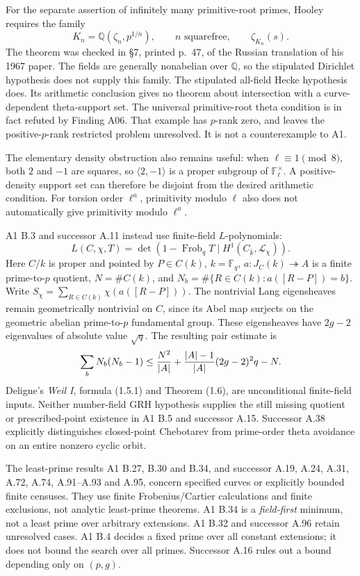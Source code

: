 \documentclass[11pt,a4paper]{article}
\begin{document}
For the separate assertion of infinitely many primitive-root primes,
Hooley requires the family
\[
 K_n=\mathbb Q(\zeta_n,p^{1/n}),\qquad n\text{ squarefree},
 \qquad \zeta_{K_n}(s).
\]
The theorem was checked in \S7, printed p.~47, of the Russian
translation of his 1967 paper. The fields are generally nonabelian
over $\mathbb Q$, so the stipulated Dirichlet hypothesis does not
supply this family. The stipulated all-field Hecke hypothesis does.
Its arithmetic conclusion gives no theorem about intersection with a
curve-dependent theta-support set. The universal primitive-root theta
condition is in fact refuted by Finding A06. That example has
$p$-rank zero, and leaves the positive-$p$-rank restricted problem
unresolved. It is not a counterexample to A1.

The elementary density obstruction also remains useful: when
$\ell\equiv1\pmod8$, both $2$ and $-1$ are squares, so
$\langle2,-1\rangle$ is a proper subgroup of
$\mathbb F_\ell^\times$. A positive-density support set can therefore
be disjoint from the desired arithmetic condition. For torsion order
$\ell^a$, primitivity modulo $\ell$ also does not automatically
give primitivity modulo $\ell^a$.

A1 B.3 and successor A.11 instead use finite-field $L$-polynomials:
\[
 L(C,\chi,T)=\det(1-\operatorname{Frob}_qT
                  \mid H^1(C_{\bar k},\mathcal L_\chi)).
\]
Here $C/k$ is proper and pointed by $P\in C(k)$, $k=\mathbb F_q$,
$a:J_C(k)\twoheadrightarrow A$ is a finite prime-to-$p$ quotient,
$N=\#C(k)$, and
$N_b=\#\{R\in C(k):a([R-P])=b\}$.
Write $S_\chi=\sum_{R\in C(k)}\chi(a([R-P]))$.
The nontrivial Lang eigensheaves remain geometrically nontrivial
on $C$, since its Abel map surjects on the geometric abelian
prime-to-$p$ fundamental group. These eigensheaves have $2g-2$
eigenvalues of absolute value $\sqrt q$. The resulting pair estimate is
\[
 \sum_bN_b(N_b-1)
 \le {N^2\over|A|}
   +{|A|-1\over|A|}(2g-2)^2q-N.
\]
Deligne's \emph{Weil I}, formula (1.5.1) and Theorem (1.6), are
unconditional finite-field inputs. Neither number-field GRH hypothesis
supplies the still missing quotient or prescribed-point existence in
A1 B.5 and successor A.15. Successor A.38 explicitly distinguishes
closed-point Chebotarev from prime-order theta avoidance on an entire
nonzero cyclic orbit.

The least-prime results A1 B.27, B.30 and B.34, and successor
A.19, A.24, A.31, A.72, A.74, A.91--A.93 and A.95, concern specified
curves or explicitly bounded finite censuses. They use finite
Frobenius/Cartier calculations and finite exclusions, not analytic
least-prime theorems. A1 B.34 is a \emph{field-first} minimum, not a
least prime over arbitrary extensions. A1 B.32 and successor A.96
retain unresolved cases. A1 B.4 decides a fixed prime over all
constant extensions; it does not bound the search over all primes.
Successor A.16 rules out a bound depending only on $(p,g)$.
\end{document}
